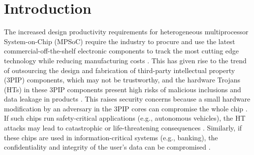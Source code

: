 \documentclass[10pt,journal, compsoc]{IEEEtran}
\begin{document}
\IEEEdisplaynontitleabstractindextext



%
\IEEEpeerreviewmaketitle



\section{Introduction}

The increased design productivity requirements for heterogeneous multiprocessor System-on-Chip (MPSoC) require the industry to procure and use the latest commercial-off-the-shelf electronic components to track the most cutting edge technology while reducing manufacturing costs \cite{article:KX}. This has given rise to the trend of outsourcing the design and fabrication of third-party intellectual property (3PIP) components, which may not be trustworthy, and the hardware Trojans (HTs) in these 3PIP components present high risks of malicious inclusions and data leakage in products \cite{conference:XW}. This raises security concerns \cite{article:SB} because a small hardware modification by an adversary in the 3PIP cores can compromise the whole chip \cite{conference:MH}. If such chips run safety-critical applications (e.g., autonomous vehicles), the HT attacks may lead to catastrophic or life-threatening consequences \cite{conference:AM1}. Similarly, if these chips are used in information-critical systems (e.g., banking), the confidentiality and integrity of the user's data can be compromised \cite{conference:FK}.

\end{document}
